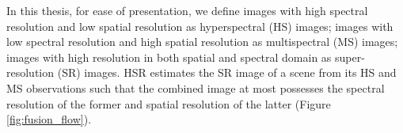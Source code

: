 In this thesis, for ease of presentation, we define images with high
spectral resolution and low spatial resolution as hyperspectral (HS) images;
images with low spectral resolution and high spatial resolution as
multispectral (MS) images; images with high resolution in both spatial and
spectral domain as super-resolution (SR) images.
HSR estimates the SR image of a scene from its HS and MS observations such
that the combined image at most possesses the spectral resolution of the
former and spatial resolution of the latter (Figure \ref{fig:fusion_flow}).
\begin{figure}[t]
    \centering
\end{figure}
